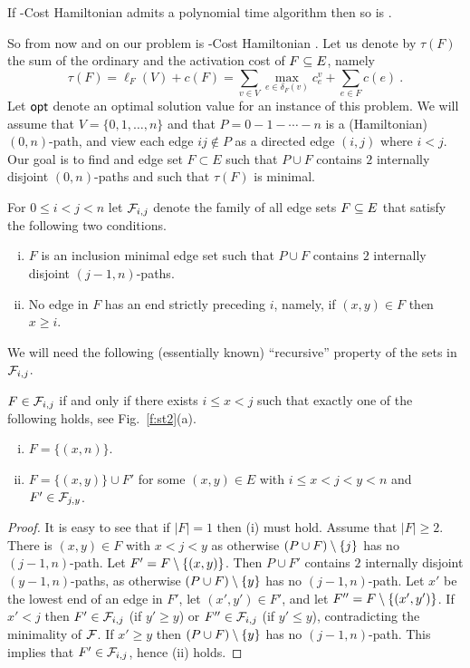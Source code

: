 \documentclass[a4paper,UKenglish,autoref]{lipics-v2019}
\begin{document}
\begin{corollary}
If {-Cost Hamiltonian} {\atdpa} admits a polynomial time algorithm %
then so is {\atdpa}.
\end{corollary}

So from now and on our problem is {-Cost Hamiltonian} {\atdpa}. 
Let us denote by $\tau(F)$ the sum of the ordinary and the activation cost of $F \subseteq E$, namely
\[
\tau(F)=\ell_F(V)+c(F)=\sum_{v \in V}\max_{e \in \delta_F(v)}c_e^v+\sum_{e \in F} c(e) \ .
\]
Let ${\sf opt}$ denote an optimal solution value for an instance of this problem. 
We will assume that $V=\{0,1, \ldots,n\}$ and that $P=0-1 - \cdots - n$ is a (Hamiltonian) $(0,n)$-path,
and view each edge $ij \notin P$ as a directed edge $(i,j)$ where $i<j$. %
Our goal is to find and edge set $F \subset E$ such that $P \cup F$ contains $2$ internally disjoint $(0,n)$-paths 
and such that $\tau(F)$ is minimal.

\begin{definition}
For $0 \leq i < j< n$ let ${\cal F}_{i,j}$ denote the family of all edge sets $F \subseteq E$ that satisfy the following 
two conditions. 
\begin{enumerate}[(i)]
\item 
$F$ is an inclusion minimal edge set such that $P \cup F$ contains $2$ internally disjoint $(j-1,n)$-paths.
\item
No edge in $F$ has an end strictly preceding $i$, namely, if $(x,y) \in F$ then $x \geq i$.
\end{enumerate}
\end{definition}

We will need the following (essentially known) ``recursive'' property of the sets in ${\cal F}_{i,j}$.

\begin{lemma} \label{l:F}
$F \in {\cal F}_{i,j}$ if and only if there exists $i \leq x <j$ such that exactly one of the following holds, see Fig.~\ref{f:st2}(a). 
\begin{enumerate}[(i)]
\item
$F=\{(x,n)\}$. 
\item
$F=\{(x,y)\} \cup F'$ for some $(x,y) \in E$ with $i \leq x<j<y < n$ and $F' \in {\cal F}_{j,y}$.
\end{enumerate}
\end{lemma}
\begin{proof}
It is easy to see that if $|F|=1$ then (i) must hold. Assume that $|F| \geq 2$.  
There is $(x,y) \in F$ with $x<j<y$ as otherwise $(P \cup F) \setminus \{j\}$ has no $(j-1,n)$-path.
Let $F'= F \setminus \{(x,y)\}$.
Then $P \cup F'$ contains $2$ internally disjoint $(y-1,n)$-paths, 
as otherwise $(P \cup F) \setminus \{y\}$ has no $(j-1,n)$-path.
Let $x'$ be the lowest end of an edge in $F'$, let $(x',y') \in F'$, and let $F''=F \setminus \{(x',y')\}$. 
If $x' < j$ then $F' \in {\cal F}_{i,j}$ (if $y' \geq y$) or $F'' \in {\cal F}_{i,j}$ (if $y' \leq y$), contradicting the minimality of ${\cal F}$.
If $x'\geq y$ then  $(P \cup F) \setminus \{y\}$ has no $(j-1,n)$-path.
This implies that $F' \in {\cal F}_{i,j}$, hence (ii) holds. 
\end{proof}
\end{document}
